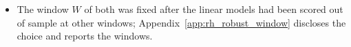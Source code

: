 \begin{itemize}
\begin{itemize}
    regular-hours bars), the design of the linear models of Table~\ref{tab:rh_oos}; one fixed hyperparameter
    configuration per tree method, never re-selected, re-estimated every bar.
  \item The window $W$ of both was fixed after the linear models had been scored out of sample at other
    windows; Appendix~\ref{app:rh_robust_window} discloses the choice and reports the windows.
  \end{itemize}
\end{itemize}


